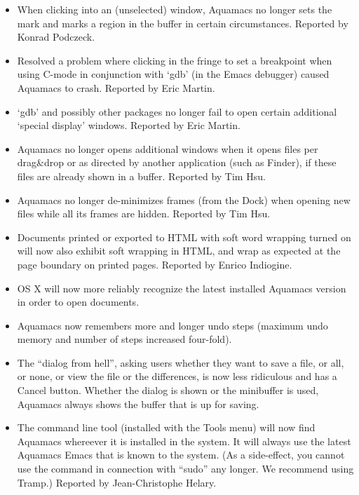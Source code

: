 \begin{itemize}
\item When clicking into an (unselected) window, Aquamacs no longer sets the mark and marks a region in the buffer in certain circumstances. 
Reported by Konrad Podczeck.

\item Resolved a problem where clicking in the fringe to set a breakpoint when using C-mode in conjunction with `gdb' (in the Emacs debugger) caused Aquamacs to crash. 
Reported by Eric Martin.

\item `gdb' and possibly other packages no longer fail to open certain additional `special display' windows.
Reported by Eric Martin.

\item Aquamacs no longer opens additional windows when it opens files per drag\&drop or as directed by another application (such as Finder), if these files are already shown in a buffer.
Reported by Tim Hsu.

\item Aquamacs no longer de-minimizes frames (from the Dock) when opening new files while all its frames are hidden.
Reported by Tim Hsu.

\item Documents printed or exported to HTML with soft word wrapping turned on will now also exhibit soft wrapping in HTML, and wrap as expected at the page boundary on printed pages.
Reported by Enrico Indiogine.

\item OS X will now more reliably recognize the latest installed Aquamacs version in order to open documents.

\item Aquamacs now remembers more and longer undo steps (maximum undo memory and number of steps increased four-fold).  

\item The ``dialog from hell'', asking users whether they want to save a file, or all, or none, or view the file or the differences, is now less ridiculous and has a Cancel button.  Whether the dialog is shown or the minibuffer is used,  Aquamacs always shows the buffer that is up for saving. 

\item The command line tool (installed with the Tools menu) will now find Aquamacs whereever it is installed in the system.  It will always use the latest Aquamacs Emacs that is known to the system.  (As a side-effect, you cannot use the command in connection with ``sudo'' any longer.  We recommend using Tramp.)
Reported by Jean-Christophe Helary.


\end{itemize}
